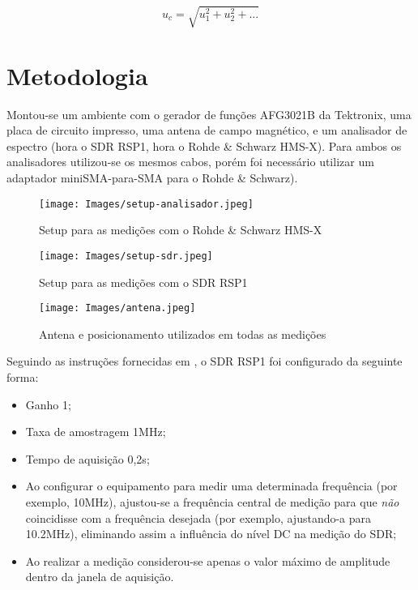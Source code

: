 $$
u_c = \sqrt{u_1^2 + u_2^2 + ...}
$$

\section{Metodologia}
Montou-se um ambiente com o gerador de funções AFG3021B da Tektronix, uma placa de circuito impresso, uma antena de campo magnético, e um analisador de espectro (hora o SDR RSP1, hora o Rohde \& Schwarz HMS-X). Para ambos os analisadores utilizou-se os mesmos cabos, porém foi necessário utilizar um adaptador miniSMA-para-SMA para o Rohde \& Schwarz).


\begin{figure}[H]
    \centering
    \caption{Setup para as medições com o Rohde \& Schwarz HMS-X}
    \texttt{[image: Images/setup-analisador.jpeg]}
    \label{fig:analisador}
\end{figure}

\begin{figure}[H]
    \centering
    \caption{Setup para as medições com o SDR RSP1}
    \texttt{[image: Images/setup-sdr.jpeg]}
    \label{fig:sdr}
\end{figure}

\begin{figure}[H]
    \centering
    \caption{Antena e posicionamento utilizados em todas as medições}
    \texttt{[image: Images/antena.jpeg]}
    \label{fig:antena}
\end{figure}

Seguindo as instruções fornecidas em \cite{tccIgor}, o SDR RSP1 foi configurado da seguinte forma:
\begin{itemize}
    \item Ganho 1;
    \item Taxa de amostragem 1MHz;
    \item Tempo de aquisição 0,2s;
    \item Ao configurar o equipamento para medir uma determinada frequência (por exemplo, 10MHz), ajustou-se a frequência central de medição para que \textit{não} coincidisse com a frequência desejada (por exemplo, ajustando-a para 10.2MHz), eliminando assim a influência do nível DC na medição do SDR;
    \item Ao realizar a medição considerou-se apenas o valor máximo de amplitude dentro da janela de aquisição.
\end{itemize}

